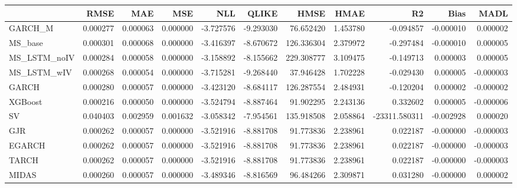 \begin{tabular}{lrrrrrrrrrr}
\toprule
 & RMSE & MAE & MSE & NLL & QLIKE & HMSE & HMAE & R2 & Bias & MADL \\
\midrule
GARCH_M & 0.000277 & 0.000063 & 0.000000 & -3.727576 & -9.293030 & 76.652420 & 1.453780 & -0.094857 & -0.000010 & 0.000002 \\
MS_base & 0.000301 & 0.000068 & 0.000000 & -3.416397 & -8.670672 & 126.336304 & 2.379972 & -0.297484 & -0.000010 & 0.000005 \\
MS_LSTM_noIV & 0.000284 & 0.000058 & 0.000000 & -3.158892 & -8.155662 & 229.308777 & 3.109475 & -0.149713 & 0.000003 & 0.000005 \\
MS_LSTM_wIV & 0.000268 & 0.000054 & 0.000000 & -3.715281 & -9.268440 & 37.946428 & 1.702228 & -0.029430 & 0.000005 & -0.000003 \\
GARCH & 0.000280 & 0.000057 & 0.000000 & -3.423120 & -8.684117 & 126.287554 & 2.484931 & -0.120204 & 0.000002 & -0.000002 \\
XGBoost & 0.000216 & 0.000050 & 0.000000 & -3.524794 & -8.887464 & 91.902295 & 2.243136 & 0.332602 & 0.000005 & -0.000006 \\
SV & 0.040403 & 0.002959 & 0.001632 & -3.058342 & -7.954561 & 135.918508 & 2.058864 & -23311.580311 & -0.002928 & 0.000020 \\
GJR & 0.000262 & 0.000057 & 0.000000 & -3.521916 & -8.881708 & 91.773836 & 2.238961 & 0.022187 & -0.000000 & -0.000003 \\
EGARCH & 0.000262 & 0.000057 & 0.000000 & -3.521916 & -8.881708 & 91.773836 & 2.238961 & 0.022187 & -0.000000 & -0.000003 \\
TARCH & 0.000262 & 0.000057 & 0.000000 & -3.521916 & -8.881708 & 91.773836 & 2.238961 & 0.022187 & -0.000000 & -0.000003 \\
MIDAS & 0.000260 & 0.000057 & 0.000000 & -3.489346 & -8.816569 & 96.484266 & 2.309871 & 0.031280 & -0.000000 & 0.000002 \\
\bottomrule
\end{tabular}
